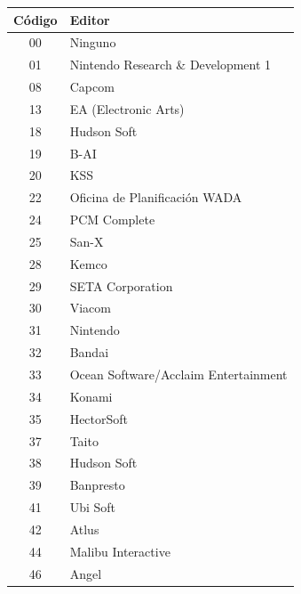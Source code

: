 \begin{longtable}{|c|l|}
\hline
\textbf{Código} & \textbf{Editor} \\ \hline
00              & Ninguno                        \\ \hline
01              & Nintendo Research \& Development 1 \\ \hline
08              & Capcom                         \\ \hline
13              & EA (Electronic Arts)           \\ \hline
18              & Hudson Soft                    \\ \hline
19              & B-AI                           \\ \hline
20              & KSS                            \\ \hline
22              & Oficina de Planificación WADA  \\ \hline
24              & PCM Complete                   \\ \hline
25              & San-X                          \\ \hline
28              & Kemco                          \\ \hline
29              & SETA Corporation               \\ \hline
30              & Viacom                         \\ \hline
31              & Nintendo                       \\ \hline
32              & Bandai                         \\ \hline
33              & Ocean Software/Acclaim Entertainment \\ \hline
34              & Konami                         \\ \hline
35              & HectorSoft                     \\ \hline
37              & Taito                          \\ \hline
38              & Hudson Soft                    \\ \hline
39              & Banpresto                      \\ \hline
41              & Ubi Soft                       \\ \hline
42              & Atlus                          \\ \hline
44              & Malibu Interactive             \\ \hline
46              & Angel                          \\ \hline

\end{longtable}
